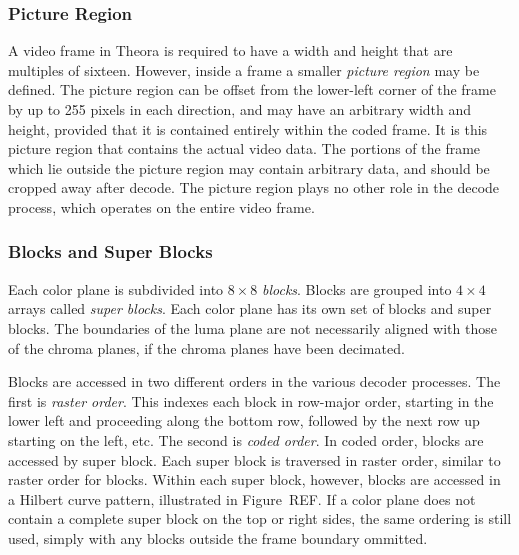 \documentclass[11pt,letterpaper]{article}
\newcommand{\term}[1]{{\em #1}}
\begin{document}
\subsubsection{Picture Region}

A video frame in Theora is required to have a width and height that are
 multiples of sixteen.
However, inside a frame a smaller \term{picture region} may be defined.
The picture region can be offset from the lower-left corner of the frame by up
 to 255 pixels in each direction, and may have an arbitrary width and height,
 provided that it is contained entirely within the coded frame.
It is this picture region that contains the actual video data.
The portions of the frame which lie outside the picture region may contain
 arbitrary data, and should be cropped away after decode.
The picture region plays no other role in the decode process, which operates on
 the entire video frame.

\subsubsection{Blocks and Super Blocks}

Each color plane is subdivided into $8\times 8$ \term{blocks}.
Blocks are grouped into $4\times 4$ arrays called \term{super blocks}.
Each color plane has its own set of blocks and super blocks.
The boundaries of the luma plane are not necessarily aligned with those of the
 chroma planes, if the chroma planes have been decimated.

Blocks are accessed in two different orders in the various decoder processes.
The first is \term{raster order}.
This indexes each block in row-major order, starting in the lower left and
 proceeding along the bottom row, followed by the next row up starting on the
 left, etc.
The second is \term{coded order}.
In coded order, blocks are accessed by super block.
Each super block is traversed in raster order, similar to raster order for
 blocks.
Within each super block, however, blocks are accessed in a Hilbert curve
 pattern, illustrated in Figure~REF.
If a color plane does not contain a complete super block on the top or right
 sides, the same ordering is still used, simply with any blocks outside the
 frame boundary ommitted.

\end{document}
